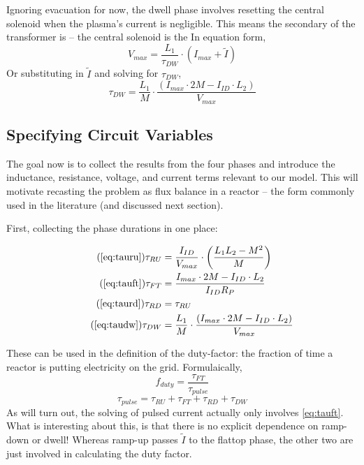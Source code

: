 Ignoring evacuation for now, the dwell phase involves resetting the central solenoid when the plasma's current is negligible. This  means the secondary of the transformer is  --  the central solenoid is the  In equation form,
\begin{equation}
	V_{max} = \frac{L_1}{\tau_{DW}} \cdot \left( I_{max} + \tilde I \right)
\end{equation}
Or substituting in $\tilde I$ and solving for $\tau_{DW}$,
\begin{equation}
	\label{eq:taudw}
	\tau_{DW} = \frac{L_1}{M} \cdot \frac{ \left( I_{max} \cdot 2 M - I_{ID} \cdot  L_2 \right) }{V_{max}}
\end{equation}

\subsection{Specifying Circuit Variables}

The goal now is to collect the results from the four phases and introduce the inductance, resistance, voltage, and current terms relevant to our model. This will motivate recasting the problem as flux balance in a reactor -- the form commonly used in the literature (and discussed next section).

First, collecting the phase durations in one place:

\begin{align}
	\tag{\ref{eq:tauru}}
	\tau_{RU} &= \frac{I_{ID}}{V_{max}} \cdot \left( \frac{ L_1 L_2 - M^2 }{ M } \right) \\
	\tag{\ref{eq:tauft}}
	\tau_{FT} &= \frac{ I_{max} \cdot 2 M - I_{ID} \cdot  L_2 }{I_{ID} R_P} \\
	\tag{\ref{eq:taurd}}
	\tau_{RD} &= \tau_{RU} \\
	\tag{\ref{eq:taudw}}
	\tau_{DW} &= \frac{L_1}{M} \cdot \frac{ \left( I_{max} \cdot 2 M - I_{ID} \cdot  L_2 \right) }{V_{max}}
\end{align}

These can be used in the definition of the duty-factor: the fraction of time a reactor is putting electricity on the grid. Formulaically,
\begin{equation}
	\label{eq:duty}
	f_{duty} = \frac{\tau_{FT}}{\tau_{pulse}}
\end{equation}
\begin{equation}
	\tau_{pulse} = \tau_{RU} + \tau_{FT} + \tau_{RD} + \tau_{DW}
\end{equation}
As will turn out, the solving of pulsed current actually only involves \cref{eq:tauft}. What is interesting about this, is that there is no explicit dependence on ramp-down or dwell! Whereas ramp-up passes $\tilde I$ to the flattop phase, the other two are just involved in calculating the duty factor.

